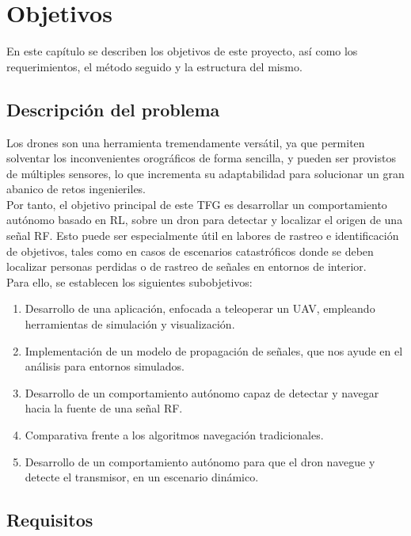 \chapter{Objetivos}
\label{cap:capitulo2}

En este capítulo se describen los objetivos de este proyecto, así como los requerimientos, el método seguido y la estructura del mismo.\\

\section{Descripción del problema}
\label{sec:descripcion_problema}

Los drones son una herramienta tremendamente versátil, ya que permiten solventar los inconvenientes orográficos de forma sencilla, y pueden ser provistos de múltiples sensores, lo que incrementa su adaptabilidad para solucionar un gran abanico de retos ingenieriles.\\

Por tanto, el objetivo principal de este \ac{TFG} es desarrollar un comportamiento autónomo basado en \ac{RL}, sobre un dron para detectar y localizar el origen de una señal \ac{RF}. Esto puede ser especialmente útil en labores de rastreo e identificación de objetivos, tales como en casos de escenarios catastróficos donde se deben localizar personas perdidas o de rastreo de señales en entornos de interior.\\

Para ello, se establecen los siguientes subobjetivos:

\begin{enumerate}
	\item Desarrollo de una aplicación, enfocada a teleoperar un \ac{UAV}, empleando herramientas de simulación y visualización.
	\item Implementación de un modelo de propagación de señales, que nos ayude en el análisis para entornos simulados.
	\item Desarrollo de un comportamiento autónomo capaz de detectar y navegar hacia la fuente de una señal \ac{RF}.
	\item Comparativa frente a los algoritmos navegación tradicionales.
	\item Desarrollo de un comportamiento autónomo para que el dron navegue y detecte el transmisor, en un escenario dinámico.
\end{enumerate}

\section{Requisitos}
\label{sec:requisitos}

